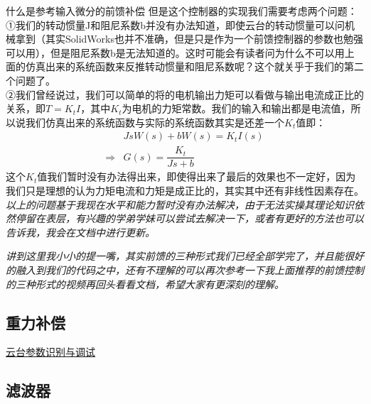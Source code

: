 \documentclass[UTF8,a4paper,12pt]{ctexart}
\begin{document}
\begin{titlebox}{什么是参考输入微分的前馈补偿}
{            但是这个控制器的实现我们需要考虑两个问题：\\①我们的转动惯量J和阻尼系数b并没有办法知道，即使云台的转动惯量可以问机械拿到（其实SolidWorks也并不准确，但是只是作为一个前馈控制器的参数也勉强可以用），但是阻尼系数b是无法知道的。这时可能会有读者问为什么不可以用上面的仿真出来的系统函数来反推转动惯量和阻尼系数呢？这个就关乎于我们的第二个问题了。\\
            ②我们曾经说过，我们可以简单的将的电机输出力矩可以看做与输出电流成正比的关系，即$T=K_tI$，其中$K_t$为电机的力矩常数。我们的输入和输出都是电流值，所以说我们仿真出来的系统函数与实际的系统函数其实是还差一个$K_t$值即：\\
            \begin{align*}
            & JsW(s)+bW(s)= K_tI(s)\\
           \Rightarrow&G(s)=\dfrac{K_t}{Js+b}
            \end{align*} 
            这个$K_t$值我们暂时没有办法得出来，即使得出来了最后的效果也不一定好，因为我们只是理想的认为力矩电流和力矩是成正比的，其实其中还有非线性因素存在。\\

            \textit{以上的问题基于我现在水平和能力暂时没有办法解决，由于无法实操其理论知识依然停留在表层，有兴趣的学弟学妹可以尝试去解决一下，或者有更好的方法也可以告诉我，我会在文档中进行更新。}\\
          }

        \end{titlebox}
        \begin{notitlebox}
        \textit{讲到这里我小小的提一嘴，其实前馈的三种形式我们已经全部学完了，并且能很好的融入到我们的代码之中，还有不理解的可以再次参考一下我上面推荐的前馈控制的三种形式的视频再回头看看文档，希望大家有更深刻的理解。}          
        \end{notitlebox}
        \subsection{重力补偿}
      \begin{flushleft}
         \href{https://www.bilibili.com/video/BV1wX7BzVEf6/?spm_id_from=333.1391.0.0&vd_source=b02f21f21dd17ebeef8dac9338c9d06c}{云台参数识别与调试}
      \end{flushleft}
     
        \subsection{滤波器}
\end{document}
